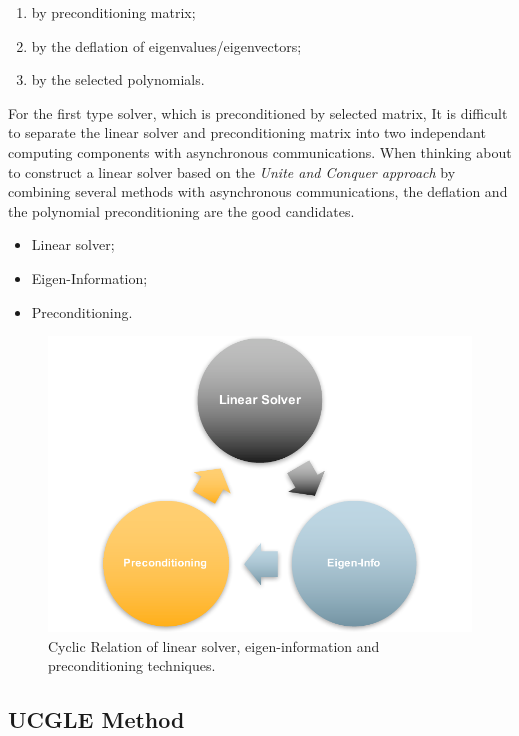 \begin{enumerate}
	\item by preconditioning matrix;
	\item by the deflation of eigenvalues/eigenvectors;
	\item by the selected polynomials.
\end{enumerate}

For the first type solver, which is preconditioned by selected matrix, It is difficult to separate the linear solver and preconditioning matrix into two independant computing components with asynchronous communications. When thinking about to construct a linear solver based on the \textit{Unite and Conquer approach} by combining several methods with asynchronous communications, the deflation and the polynomial preconditioning are the good candidates. 

\begin{itemize}
	\item Linear solver;
	\item Eigen-Information;
	\item Preconditioning.
\end{itemize}

\begin{figure}[htbp]
	\centering
	\includegraphics[width=5.2in]{fig/cyclic.pdf}
	\caption{Cyclic Relation of linear solver, eigen-information and preconditioning techniques.}
	\label{fig:cyclic}
\end{figure}

\subsection{UCGLE Method} \label{UCGLE}

